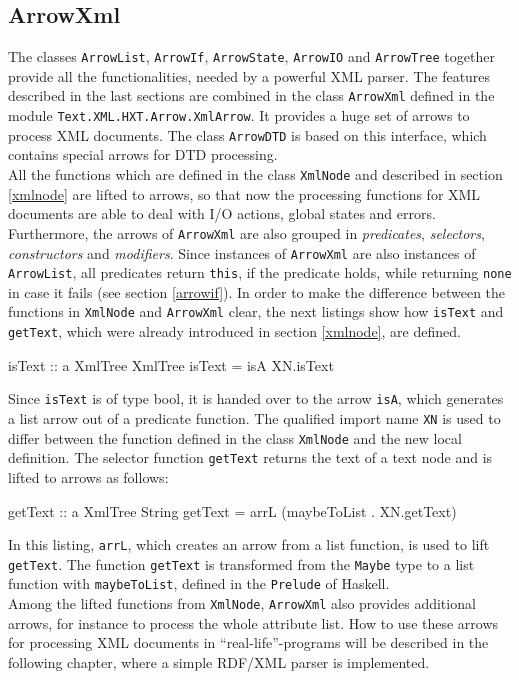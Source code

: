 \documentclass[11pt,a4paper,headsepline, bibtotoc]{scrreprt}
\begin{document}
\subsection{ArrowXml}
The classes \texttt{ArrowList}, \texttt{ArrowIf}, \texttt{ArrowState}, \texttt{ArrowIO} and \texttt{ArrowTree} together provide all the functionalities, needed by a powerful XML parser. The features described in the last sections are combined in the class \texttt{ArrowXml} defined in the module \texttt{Text.XML.HXT.Ar\-row.XmlArrow}. It provides a huge set of arrows to process XML documents.  The class \texttt{ArrowDTD} is based on this interface, which contains special arrows for DTD processing.\\ 
All the functions which are defined in the class \texttt{XmlNode} and described in section \ref{xmlnode} are lifted to arrows, so that now the processing functions for XML documents are able to deal with I/O actions, global states and errors. Furthermore, the arrows of \texttt{ArrowXml} are also grouped in \textit{predicates}, \textit{selectors}, \textit{constructors} and \textit{modifiers}. Since instances of \texttt{ArrowXml} are also instances of \texttt{ArrowList}, all predicates return \texttt{this}, if the predicate holds, while returning \texttt{none} in case it fails (see section \ref{arrowif}). In order to make the difference between the functions in \texttt{XmlNode} and \texttt{ArrowXml} clear, the next listings show how \texttt{isText} and \texttt{getText}, which were already introduced in section \ref{xmlnode}, are defined. 
\begin{code}
isText  :: a XmlTree XmlTree
isText  = isA XN.isText
\end{code}  
Since \texttt{isText} is of type bool, it is handed over to the arrow \texttt{isA}, which generates a list arrow out of a predicate function. The qualified import name \texttt{XN} is used to differ between the function defined in the class \texttt{XmlNode} and the new local definition. The selector function \texttt{getText} returns the text of a text node and is lifted to arrows as follows:
\begin{code}
getText :: a XmlTree String
getText = arrL (maybeToList  . XN.getText)
\end{code}
In this listing, \texttt{arrL}, which creates an arrow from a list function, is used to lift \texttt{getText}. The function \texttt{getText} is transformed from the \texttt{Maybe} type to a list function with \texttt{maybeToList}, defined in the \texttt{Prelude} of Haskell.\\
Among the lifted functions from \texttt{XmlNode}, \texttt{ArrowXml} also provides additional arrows, for instance to process the whole attribute list. How to use these arrows for processing XML documents in ``real-life''-programs will be described in the following chapter, where a simple RDF/XML parser is implemented.
\end{document}
